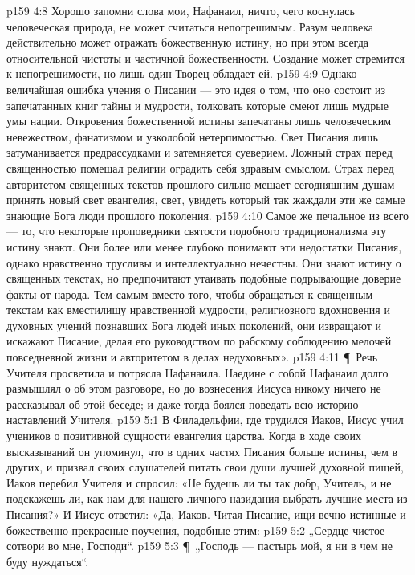 \vs p159 4:8 Хорошо запомни слова мои, Нафанаил, ничто, чего коснулась человеческая природа, не может считаться непогрешимым. Разум человека действительно может отражать божественную истину, но при этом всегда относительной чистоты и частичной божественности. Создание может стремится к непогрешимости, но лишь один Творец обладает ей.
\vs p159 4:9 Однако величайшая ошибка учения о Писании --- это идея о том, что оно состоит из запечатанных книг тайны и мудрости, толковать которые смеют лишь мудрые умы нации. Откровения божественной истины запечатаны лишь человеческим невежеством, фанатизмом и узколобой нетерпимостью. Свет Писания лишь затуманивается предрассудками и затемняется суеверием. Ложный страх перед священностью помешал религии оградить себя здравым смыслом. Страх перед авторитетом священных текстов прошлого сильно мешает сегодняшним душам принять новый свет евангелия, свет, увидеть который так жаждали эти же самые знающие Бога люди прошлого поколения.
\vs p159 4:10 Самое же печальное из всего --- то, что некоторые проповедники святости подобного традиционализма эту истину знают. Они более или менее глубоко понимают эти недостатки Писания, однако нравственно трусливы и интеллектуально нечестны. Они знают истину о священных текстах, но предпочитают утаивать подобные подрывающие доверие факты от народа. Тем самым вместо того, чтобы обращаться к священным текстам как вместилищу нравственной мудрости, религиозного вдохновения и духовных учений познавших Бога людей иных поколений, они извращают и искажают Писание, делая его руководством по рабскому соблюдению мелочей повседневной жизни и авторитетом в делах недуховных».
\vs p159 4:11 \P\ Речь Учителя просветила и потрясла Нафанаила. Наедине с собой Нафанаил долго размышлял о об этом разговоре, но до вознесения Иисуса никому ничего не рассказывал об этой беседе; и даже тогда боялся поведать всю историю наставлений Учителя.
\vs p159 5:1 В Филадельфии, где трудился Иаков, Иисус учил учеников о позитивной сущности евангелия царства. Когда в ходе своих высказываний он упоминул, что в одних частях Писания больше истины, чем в других, и призвал своих слушателей питать свои души лучшей духовной пищей, Иаков перебил Учителя и спросил: «Не будешь ли ты так добр, Учитель, и не подскажешь ли, как нам для нашего личного назидания выбрать лучшие места из Писания?» И Иисус ответил: «Да, Иаков. Читая Писание, ищи вечно истинные и божественно прекрасные поучения, подобные этим:
\vs p159 5:2 „Сердце чистое сотвори во мне, Господи“.
\vs p159 5:3 \P\ „Господь --- пастырь мой, я ни в чем не буду нуждаться“.
